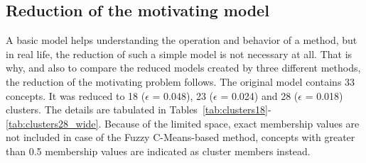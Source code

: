\documentclass[graybox]{svmult}
\begin{document}
\begin{table}
  \caption{Connection matrix and data vectors of the basic example model \cite{hatwagnernovel}.}
  \label{tab:connBasic}
  \begin{center}
    \hspace{1em}
  \end{center}
\end{table}

\subsection{Reduction of the motivating model}

A basic model helps understanding the operation and behavior of a 
method, but in real life, the reduction of such a simple model is not 
necessary at all. That is why, and also to compare the reduced models 
created by three different methods, the reduction of the motivating 
problem follows. The original model contains 33 concepts. It was 
reduced to 18 ($\epsilon$ = 0.048), 23 ($\epsilon$ = 0.024) and 28 
($\epsilon$ = 0.018) clusters. The details are tabulated in 
Tables~\ref{tab:clusters18}-\ref{tab:clusters28_wide}. Because of the 
limited space, exact membership values are not included in case of the 
Fuzzy C-Means-based method, concepts with greater than 0.5 
membership values are indicated as cluster members instead.
\end{document}
